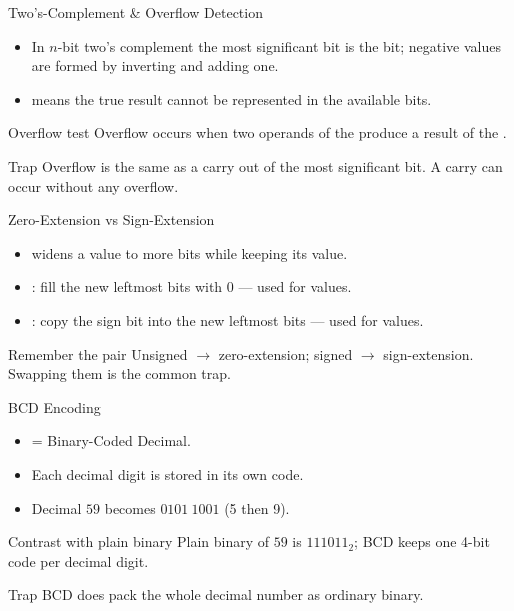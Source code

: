 \documentclass[aspectratio=169]{beamer}
\begin{document}
\begin{frame}{Two's-Complement \& Overflow Detection}
  \begin{itemize}
    \item In $n$-bit two's complement the most significant bit is the
       bit; negative values are formed by inverting and adding one.
    \item {} means the true result cannot be represented in the
      available bits.
  \end{itemize}
  \begin{block}{Overflow test}
    Overflow occurs when two operands of the  produce a result
    of the .
  \end{block}
  \begin{alertblock}{Trap}
    Overflow is  the same as a carry out of the most significant
    bit. A carry can occur without any overflow.
  \end{alertblock}
\end{frame}

\begin{frame}{Zero-Extension vs Sign-Extension}
  \begin{itemize}
    \item {} widens a value to more bits while keeping its
      value.
    \item {}: fill the new leftmost bits with 0 --- used
      for  values.
    \item {}: copy the sign bit into the new leftmost bits
      --- used for  values.
  \end{itemize}
  \begin{block}{Remember the pair}
    Unsigned $\rightarrow$ zero-extension; signed $\rightarrow$
    sign-extension. Swapping them is the common trap.
  \end{block}
\end{frame}

\begin{frame}{BCD Encoding}
  \begin{itemize}
    \item {} = Binary-Coded Decimal.
    \item Each decimal digit is stored in its own  code.
    \item Decimal $59$ becomes $0101\ 1001$ (5 then 9).
  \end{itemize}
  \begin{block}{Contrast with plain binary}
    Plain binary of $59$ is $111011_2$; BCD keeps one 4-bit code per decimal
    digit.
  \end{block}
  \begin{alertblock}{Trap}
    BCD does  pack the whole decimal number as ordinary binary.
  \end{alertblock}
\end{frame}
\end{document}
